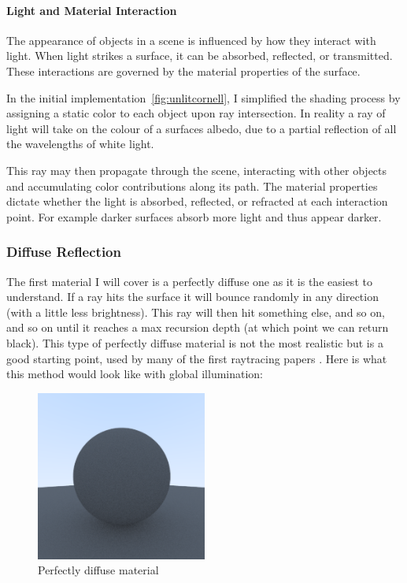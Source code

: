 \documentclass[12pt]{article}
\begin{document}
\paragraph{Light and Material Interaction}
The appearance of objects in a scene is influenced by how they interact with light. When light strikes a surface, it can be absorbed, reflected, or transmitted. These interactions are governed by the material properties of the surface.

In the initial implementation~\ref{fig:unlitcornell}, I simplified the shading process by assigning a static color to each object upon ray intersection. In reality a ray of light will take on the colour of a surfaces albedo, due to a partial reflection of all the wavelengths of white light.

This ray may then propagate through the scene, interacting with other objects and accumulating color contributions along its path. The material properties dictate whether the light is absorbed, reflected, or refracted at each interaction point. For example darker surfaces absorb more light and thus appear darker.

\subsubsection{Diffuse Reflection}
The first material I will cover is a perfectly diffuse one as it is the easiest to understand. If a ray hits the surface it will bounce randomly in any direction (with a little less brightness). This ray will then hit something else, and so on, and so on until it reaches a max recursion depth (at which point we can return black). This type of perfectly diffuse material is not the most realistic but is a good starting point, used by many of the first raytracing papers \cite{Whitted1980}. Here is what this method would look like with global illumination:

\begin{figure}[H]
    \centering
    \includegraphics[width=0.5\textwidth]{images/lambertian/uniform_diffuse.png}
    \caption{Perfectly diffuse material}
    \label{fig:perfdiffmat}
\end{figure}
\end{document}
